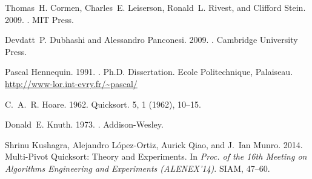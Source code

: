 \documentclass[prodmode,acmtalg]{acmsmall}
\begin{document}
\begin{thebibliography}{00}



\ifx \showCODEN    \undefined {}     \fi
\ifx \showDOI      \undefined \def \showDOI       #1{{\tt DOI:}\penalty0{#1}\ }
  \fi
\ifx \showISBNx    \undefined \def \showISBNx     #1{\unskip}     \fi
\ifx \showISBNxiii \undefined \def \showISBNxiii  #1{\unskip}     \fi
\ifx \showISSN     \undefined \def \showISSN      #1{\unskip}     \fi
\ifx \showLCCN     \undefined \def \showLCCN      #1{\unskip}     \fi
\ifx \shownote     \undefined \def \shownote      #1{#1}          \fi
\ifx \showarticletitle \undefined \def \showarticletitle #1{#1}   \fi
\ifx \showURL      \undefined \def \showURL       #1{#1}          \fi

{Thomas~H. Cormen}, {Charles~E. Leiserson}, {Ronald~L. Rivest}, {and} {Clifford
  Stein}. 2009.
.
\newblock MIT Press.
\newblock
\showISBNx{978-0-262-03384-8}


{Devdatt~P. Dubhashi} {and} {Alessandro Panconesi}. 2009.
.
\newblock Cambridge University Press.
\newblock
\showISBNx{978-0-521-88427-3}


{Pascal Hennequin}. 1991.
.
\newblock Ph.D. Dissertation. Ecole Politechnique, Palaiseau.
\newblock
\showURL{\url{http://www-lor.int-evry.fr/~pascal/}}


{C.~A.~R. Hoare}. 1962.
\newblock \showarticletitle{Quicksort}.
 {5}, 1 (1962), 10--15.
\newblock


{Donald~E. Knuth}. 1973.
.
\newblock Addison-Wesley.
\newblock
\showISBNx{0-201-03803-X}


{Shrinu Kushagra}, {Alejandro L{\'o}pez-Ortiz}, {Aurick Qiao}, {and} {J.~Ian
  Munro}. 2014.
\newblock \showarticletitle{Multi-Pivot Quicksort: Theory and Experiments}. In
  {\em Proc. of the 16th Meeting on Algorithms Engineering and Experiments
  ({ALENEX}'14)}. SIAM, 47--60.
\newblock



\end{thebibliography}
\end{document}
